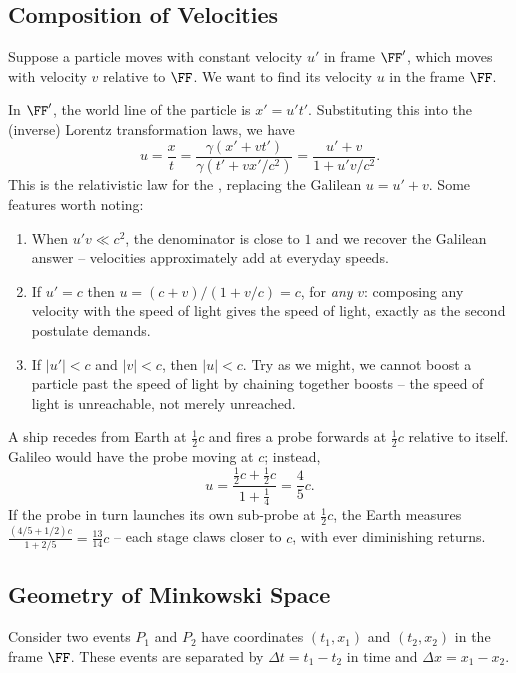 \documentclass[a4paper]{scrartcl}
\begin{document}
\subsection{Composition of Velocities}

Suppose a particle moves with constant velocity $u'$ in frame $\FF'$, which moves with velocity $v$ relative to $\FF$. We want to find its velocity $u$ in the frame $\FF$.

In $\FF'$, the world line of the particle is $x' = u't'$. Substituting this into the (inverse) Lorentz transformation laws, we have
$$
u = \frac{x}{t} = \frac{\gamma(x' + vt')}{\gamma(t' + vx'/c^2)} = \frac{u' + v}{1 + u' v/c^2}.
$$
This is the relativistic law for the , replacing the Galilean $u = u' + v$. Some features worth noting:
\begin{enumerate}[label=(\roman*)]
	\item When $u'v \ll c^2$, the denominator is close to $1$ and we recover the Galilean answer -- velocities approximately add at everyday speeds.
	\item If $u' = c$ then $u = (c + v)/(1 + v/c) = c$, for \emph{any} $v$: composing any velocity with the speed of light gives the speed of light, exactly as the second postulate demands.
	\item If $|u'| < c$ and $|v| < c$, then $|u| < c$. Try as we might, we cannot boost a particle past the speed of light by chaining together boosts -- the speed of light is unreachable, not merely unreached.
\end{enumerate}

\begin{example}
	A ship recedes from Earth at $\frac{1}{2}c$ and fires a probe forwards at $\frac{1}{2}c$ relative to itself. Galileo would have the probe moving at $c$; instead,
	$$
	u = \frac{\frac{1}{2}c + \frac{1}{2}c}{1 + \frac{1}{4}} = \frac{4}{5}c.
	$$
	If the probe in turn launches its own sub-probe at $\frac{1}{2}c$, the Earth measures $\frac{(4/5 + 1/2)c}{1 + 2/5} = \frac{13}{14}c$ -- each stage claws closer to $c$, with ever diminishing returns.
\end{example}


\subsection{Geometry of Minkowski Space}

Consider two events $P_1$ and $P_2$ have coordinates $(t_1, x_1)$ and $(t_2, x_2)$ in the frame $\FF$. These events are separated by $\Delta t = t_1 - t_2$ in time and $\Delta x = x_1 - x_2$.
\end{document}
